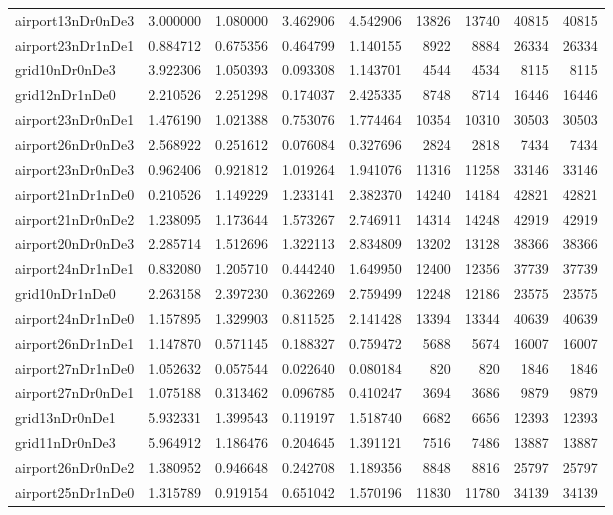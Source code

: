 \begin{longtable}{|l|r|r|r|r|r|r|r|r|}
airport13nDr0nDe3 & 3.000000 & 1.080000 & 3.462906 & 4.542906 & 13826 & 13740 & 40815 & 40815 \\
airport23nDr1nDe1 & 0.884712 & 0.675356 & 0.464799 & 1.140155 & 8922 & 8884 & 26334 & 26334 \\
grid10nDr0nDe3 & 3.922306 & 1.050393 & 0.093308 & 1.143701 & 4544 & 4534 & 8115 & 8115 \\
grid12nDr1nDe0 & 2.210526 & 2.251298 & 0.174037 & 2.425335 & 8748 & 8714 & 16446 & 16446 \\
airport23nDr0nDe1 & 1.476190 & 1.021388 & 0.753076 & 1.774464 & 10354 & 10310 & 30503 & 30503 \\
airport26nDr0nDe3 & 2.568922 & 0.251612 & 0.076084 & 0.327696 & 2824 & 2818 & 7434 & 7434 \\
airport23nDr0nDe3 & 0.962406 & 0.921812 & 1.019264 & 1.941076 & 11316 & 11258 & 33146 & 33146 \\
airport21nDr1nDe0 & 0.210526 & 1.149229 & 1.233141 & 2.382370 & 14240 & 14184 & 42821 & 42821 \\
airport21nDr0nDe2 & 1.238095 & 1.173644 & 1.573267 & 2.746911 & 14314 & 14248 & 42919 & 42919 \\
airport20nDr0nDe3 & 2.285714 & 1.512696 & 1.322113 & 2.834809 & 13202 & 13128 & 38366 & 38366 \\
airport24nDr1nDe1 & 0.832080 & 1.205710 & 0.444240 & 1.649950 & 12400 & 12356 & 37739 & 37739 \\
grid10nDr1nDe0 & 2.263158 & 2.397230 & 0.362269 & 2.759499 & 12248 & 12186 & 23575 & 23575 \\
airport24nDr1nDe0 & 1.157895 & 1.329903 & 0.811525 & 2.141428 & 13394 & 13344 & 40639 & 40639 \\
airport26nDr1nDe1 & 1.147870 & 0.571145 & 0.188327 & 0.759472 & 5688 & 5674 & 16007 & 16007 \\
airport27nDr1nDe0 & 1.052632 & 0.057544 & 0.022640 & 0.080184 & 820 & 820 & 1846 & 1846 \\
airport27nDr0nDe1 & 1.075188 & 0.313462 & 0.096785 & 0.410247 & 3694 & 3686 & 9879 & 9879 \\
grid13nDr0nDe1 & 5.932331 & 1.399543 & 0.119197 & 1.518740 & 6682 & 6656 & 12393 & 12393 \\
grid11nDr0nDe3 & 5.964912 & 1.186476 & 0.204645 & 1.391121 & 7516 & 7486 & 13887 & 13887 \\
airport26nDr0nDe2 & 1.380952 & 0.946648 & 0.242708 & 1.189356 & 8848 & 8816 & 25797 & 25797 \\
airport25nDr1nDe0 & 1.315789 & 0.919154 & 0.651042 & 1.570196 & 11830 & 11780 & 34139 & 34139 \\

\end{longtable}
